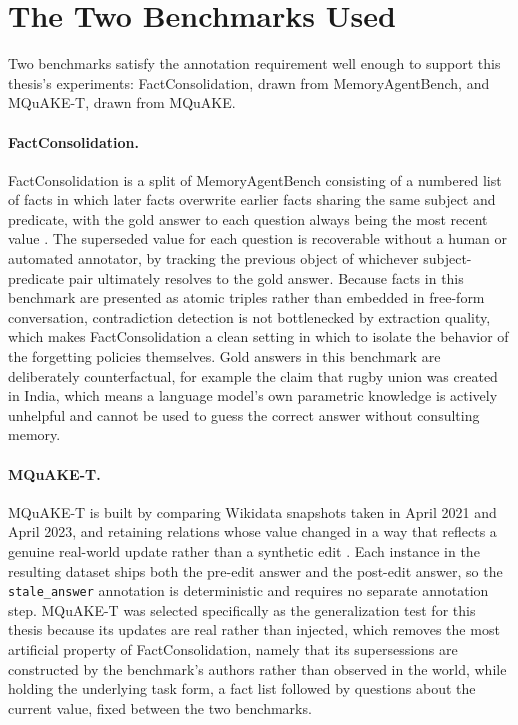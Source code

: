 \section{The Two Benchmarks Used}
\label{sec:two-benchmarks}

Two benchmarks satisfy the annotation requirement well enough to support this thesis's experiments: FactConsolidation, drawn from MemoryAgentBench, and MQuAKE-T, drawn from MQuAKE.

\paragraph{FactConsolidation.} FactConsolidation is a split of MemoryAgentBench consisting of a numbered list of facts in which later facts overwrite earlier facts sharing the same subject and predicate, with the gold answer to each question always being the most recent value \citep{hu2026memoryagentbench}. The superseded value for each question is recoverable without a human or automated annotator, by tracking the previous object of whichever subject-predicate pair ultimately resolves to the gold answer. Because facts in this benchmark are presented as atomic triples rather than embedded in free-form conversation, contradiction detection is not bottlenecked by extraction quality, which makes FactConsolidation a clean setting in which to isolate the behavior of the forgetting policies themselves. Gold answers in this benchmark are deliberately counterfactual, for example the claim that rugby union was created in India, which means a language model's own parametric knowledge is actively unhelpful and cannot be used to guess the correct answer without consulting memory.

\paragraph{MQuAKE-T.} MQuAKE-T is built by comparing Wikidata snapshots taken in April 2021 and April 2023, and retaining relations whose value changed in a way that reflects a genuine real-world update rather than a synthetic edit \citep{zhong2023mquake}. Each instance in the resulting dataset ships both the pre-edit answer and the post-edit answer, so the \texttt{stale\_answer} annotation is deterministic and requires no separate annotation step. MQuAKE-T was selected specifically as the generalization test for this thesis because its updates are real rather than injected, which removes the most artificial property of FactConsolidation, namely that its supersessions are constructed by the benchmark's authors rather than observed in the world, while holding the underlying task form, a fact list followed by questions about the current value, fixed between the two benchmarks.

